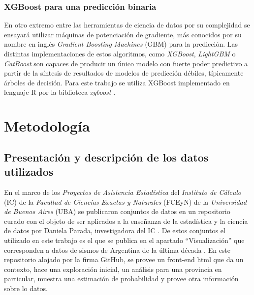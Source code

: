 \documentclass[a4paper]{report}
\begin{document}
\subsection{XGBoost para una predicción binaria}

En otro extremo entre las herramientas de ciencia de datos por su complejidad se ensayará utilizar máquinas de potenciación de gradiente, más conocidos por su nombre en inglés \emph{Gradient Boosting Machines} (GBM) para la predicción.
Las distintas implementaciones de estos algoritmos, como \emph{XGBoost}, \emph{LightGBM} o \emph{CatBoost} son capaces de producir un único modelo con fuerte poder predictivo a partir de la síntesis de resultados de modelos de predicción débiles, típicamente árboles de decisión. 
Para este trabajo se utiliza XGBoost implementado en lenguaje R por la biblioteca \emph{xgboost} \cite{chen_xgboost_2024}.






\chapter{Metodología}

\section{Presentación y descripción de los datos utilizados}\label{sec:datos}

En el marco de los \emph{Proyectos de Asistencia Estadística} del \emph{Instituto de Cálculo} (IC) de la \emph{Facultad de Ciencias Exactas y Naturales} (FCEyN) de la \emph{Universidad de Buenos Aires} (UBA) se publicaron conjuntos de datos en un repositorio curado con el objeto de ser aplicados a la enseñanza de la estadística y la ciencia de datos por Daniela Parada, investigadora del IC \cite{noauthor_ic-datasets-docencia_nodate}.
De estos conjuntos el utilizado en este trabajo es el que se publica en el apartado ``Visualización'' que corresponden a datos de sismos de Argentina de la última década \cite{daniela_parada_ic-datasets-docencia_nodate}. 
En este repositorio alojado por la firma GitHub, se provee un front-end html que da un contexto, hace una exploración inicial, un análisis para una provincia en particular, muestra una estimación de probabilidad y provee otra información sobre lo datos.
\end{document}
